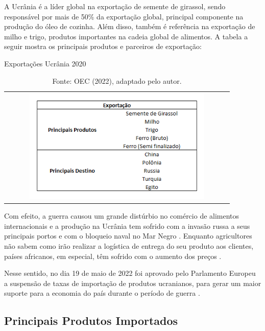 \documentclass[12pt]{article}
\begin{document}
A Ucrânia é a líder global na exportação de semente de girassol, sendo responsável por mais de 50\% da exportação global, principal componente na produção do óleo de cozinha. Além disso, também é referência na exportação de milho e trigo, produtos importantes na cadeia global de alimentos. A tabela a seguir mostra os principais produtos e parceiros de exportação:

\begin{table}[H]
    \begin{center}
        \caption{Exportações Ucrânia 2020}
        \begin{tabular}{c}
            \includegraphics[width=0.8\textwidth]{exp ukr.png}
        \end{tabular}
        \label{impukr}
        \caption*{Fonte: OEC (2022), adaptado pelo autor.}
    \end{center}
\end{table}

Com efeito, a guerra causou um grande distúrbio no comércio de alimentos internacionais e a produção na Ucrânia tem sofrido com a invasão russa a seus principais portos e com o bloqueio naval no Mar Negro \cite{asiaFoodCrisis22} \cite{russianDevelopment22}. Enquanto agricultores não sabem como irão realizar a logística de entrega do seu produto aos clientes, países africanos, em especial, têm sofrido com o aumento dos preços \cite{asiaFoodCrisis22}. 

Nesse sentido, no dia 19 de maio de 2022 foi aprovado pelo Parlamento Europeu a suspensão de taxas de importação de produtos ucranianos, para gerar um maior suporte para a economia do país durante o período de guerra \cite{suspensionImports22}.

\subsection{Principais Produtos Importados}
\end{document}
